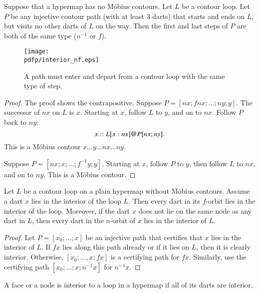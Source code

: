 \begin{lemma}
Suppose that a hypermap has no M\"obius contours. Let $L$ be a contour loop.  Let $P$ be any injective contour path (with at least $3$ darts) that starts and ends on $L$, but visits no other darts of $L$ on the way.  Then the first and last steps of $P$ are both of the same type ($n^{-1}$ or $f$).
\end{lemma}

\begin{figure}[htb]
  \centering
  \texttt{[image: \\pdfp/interior\_nf.eps]}
  \caption{A path must enter and depart from a contour loop with the same type of step.}
  \label{fig:interior_nf}
\end{figure}


\begin{proof}   The proof shows the contrapositive.   Suppose $P=[n x;f n x;\ldots;n y;y]$.   The successor of $n x$ on $L$ is $x$.  Starting at $x$,  follow $L$ to $y$, and on to $n x$.  Follow $P$ back to $n y$:
$$
x::L[x:n x] {\operatorname{@}} P[ n x;ny].
$$  
This is a M\"obius contour $x\ldots y\ldots n x\ldots n y$.

Suppose $P=[n x;x;\ldots;f^{-1} y;y]$.  Starting at $x$, follow $P$ to $y$, then follow $L$ to $n x$, and  on to $n y$.  This is a M\"obius contour.
\end{proof}

\begin{lemma}
Let $L$ be a contour loop on a plain hypermap without
M\"obius contours.  Assume a dart $x$ lies in the interior of the loop $L$. 
Then every dart in its $f$-orbit lies in
the interior of the loop.  Moreover, if the dart
$x$ does not lie on the same node as any dart in $L$, then every
dart in the $n$-orbit of $x$ lies in the interior 
of $L$.
\end{lemma}

\begin{proof} Let $P= [x_0;\ldots;x]$ be an injective path that certifies that $x$ lies in the interior of $L$.  If $f x$ lies along this path already or if it lies on $L$, then it is clearly interior.  Otherwise, $[x_0;\ldots,x;f x]$ is a certifying path for $f x$.  Similarly, use the certifying path $[x_0;\ldots;x;n^{-1} x]$ for $n^{-1} x$.
\end{proof}


\begin{definition}  A face or a node is interior to a
loop in a hypermap if all of its darts are interior.
\end{definition}


